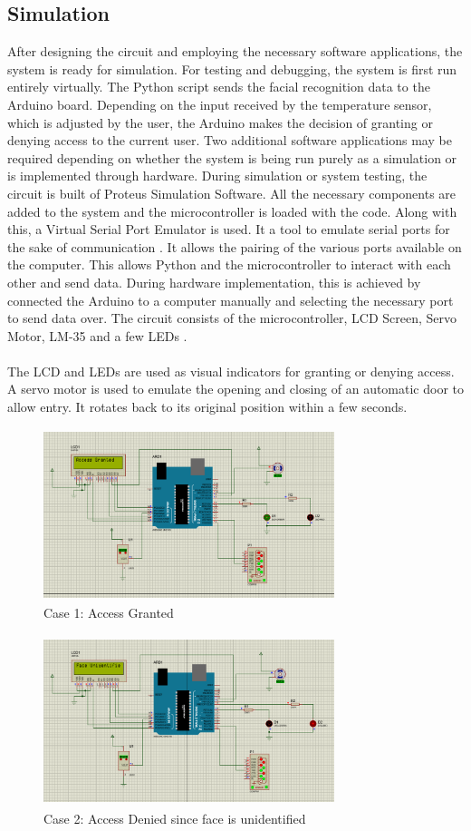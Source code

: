 \documentclass[conference]{IEEEtran}
\begin{document}
	\subsection{Simulation}
	After designing the circuit and employing the necessary
	software applications, the system is ready for simulation. For testing and debugging, the system is first run entirely virtually. The Python script sends the facial recognition data to the Arduino board. Depending on the input received by the temperature sensor, which is adjusted by the user, the Arduino makes the decision of granting or denying access to
	the current user. Two additional software applications may be required depending on whether the system is being run purely as a simulation or is implemented through hardware. During simulation or system testing, the circuit is built of Proteus Simulation Software. All the necessary components are added to the system and the microcontroller is loaded with the code. Along with this, a Virtual Serial Port Emulator is used. It a tool to emulate serial ports for the sake of communication \cite{l}. It allows the pairing of the various ports available on the computer. This allows Python and the microcontroller to interact with each other and send data. During hardware implementation, this is achieved by connected the Arduino to a computer manually and selecting the necessary port to send data over. The circuit consists of the microcontroller, LCD Screen, Servo Motor, LM-35 and a few LEDs \cite{k}. \\\\
	The LCD and LEDs are used as visual indicators for granting or denying access. A servo motor is used to emulate the opening and closing of an automatic door to allow entry. It rotates back to its original position within a few seconds. 
	\begin{figure}
		\centering
		\includegraphics[width=8.5cm, height=5cm]{ProtC1.png}
		\caption{\label{fig:The-caption}Case 1: Access Granted}
	\end{figure}
	\begin{figure}
		\centering
		\includegraphics[width=8.5cm, height=5cm]{ProtC2.png}
		\caption{\label{fig:The-caption}Case 2: Access Denied since face is unidentified}
	\end{figure}
\end{document}
